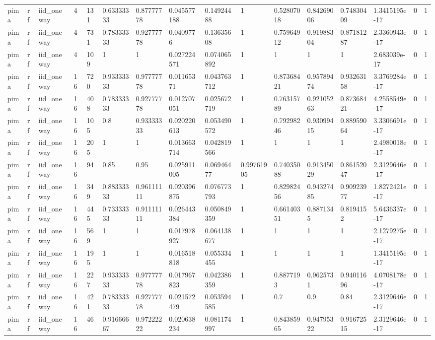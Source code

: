 \begin{tabular}{llllllllllllllll}
pima & rf & iid\_oneway & 4 & 131 & 0.63333333 & 0.87777778 & 0.045577188 & 0.14924488 & 1 & 0.52807018 & 0.84269006 & 0.74830409 & 1.3415195e-17 & 0 & 1 \\
pima & rf & iid\_oneway & 4 & 731 & 0.78333333 & 0.92777778 & 0.0409776 & 0.13635608 & 1 & 0.75964912 & 0.91988304 & 0.87181287 & 2.3360943e-17 & 0 & 1 \\
pima & rf & iid\_oneway & 4 & 109 & 1 & 1 & 0.027224571 & 0.074065892 & 1 & 1 & 1 & 1 & 2.683039e-17 & 0 & 1 \\
pima & rf & iid\_oneway & 16 & 720 & 0.93333333 & 0.97777778 & 0.01165371 & 0.043763712 & 1 & 0.87368421 & 0.95789474 & 0.93263158 & 3.3769284e-17 & 0 & 1 \\
pima & rf & iid\_oneway & 16 & 408 & 0.78333333 & 0.92777778 & 0.012707051 & 0.025672719 & 1 & 0.76315789 & 0.92105263 & 0.87368421 & 4.2558549e-17 & 0 & 1 \\
pima & rf & iid\_oneway & 16 & 105 & 0.8 & 0.93333333 & 0.020220613 & 0.053490572 & 1 & 0.79298246 & 0.93099415 & 0.88959064 & 3.3306691e-17 & 0 & 1 \\
pima & rf & iid\_oneway & 16 & 205 & 1 & 1 & 0.013663714 & 0.042819566 & 1 & 1 & 1 & 1 & 2.4980018e-17 & 0 & 1 \\
pima & rf & iid\_oneway & 16 & 94 & 0.85 & 0.95 & 0.025911005 & 0.06946477 & 0.99761905 & 0.74035088 & 0.91345029 & 0.86152047 & 2.3129646e-17 & 0 & 1 \\
pima & rf & iid\_oneway & 16 & 349 & 0.88333333 & 0.96111111 & 0.020396875 & 0.076773793 & 1 & 0.82982456 & 0.94327485 & 0.90923977 & 1.8272421e-17 & 0 & 1 \\
pima & rf & iid\_oneway & 16 & 445 & 0.73333333 & 0.91111111 & 0.026443384 & 0.050849359 & 1 & 0.66140351 & 0.8871345 & 0.8194152 & 5.6436337e-17 & 0 & 1 \\
pima & rf & iid\_oneway & 16 & 569 & 1 & 1 & 0.017978927 & 0.064138677 & 1 & 1 & 1 & 1 & 2.1279275e-17 & 0 & 1 \\
pima & rf & iid\_oneway & 16 & 195 & 1 & 1 & 0.016518818 & 0.055334455 & 1 & 1 & 1 & 1 & 1.3415195e-17 & 0 & 1 \\
pima & rf & iid\_oneway & 16 & 227 & 0.93333333 & 0.97777778 & 0.017967823 & 0.042386359 & 1 & 0.8877193 & 0.9625731 & 0.94011696 & 4.0708178e-17 & 0 & 1 \\
pima & rf & iid\_oneway & 16 & 421 & 0.78333333 & 0.92777778 & 0.021572479 & 0.053594585 & 1 & 0.7 & 0.9 & 0.84 & 2.3129646e-17 & 0 & 1 \\
pima & rf & iid\_oneway & 16 & 46 & 0.91666667 & 0.97222222 & 0.020638234 & 0.081174997 & 1 & 0.84385965 & 0.94795322 & 0.91672515 & 2.3129646e-17 & 0 & 1 \\

\end{tabular}
